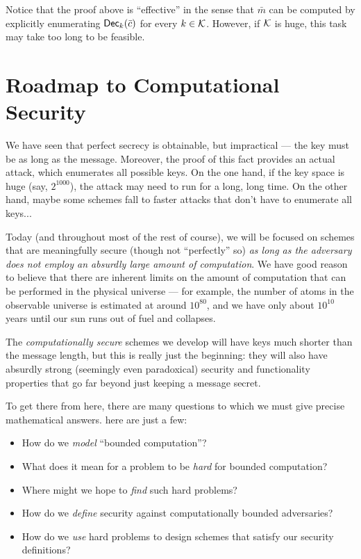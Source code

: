 \documentclass[11pt]{article}
\begin{document}
Notice that the proof above is ``effective'' in the sense that
$\bar{m}$ can be computed by explicitly enumerating
$\mathsf{Dec}_{k}(\bar{c})$ for every $k \in \mathcal{K}$.  However, if
$\mathcal{K}$ is huge, this task may take too long to be feasible.

\section{Roadmap to Computational Security}
\label{sec:roadmap-comp-sec}

We have seen that perfect secrecy is obtainable, but impractical ---
the key must be as long as the message.  Moreover, the proof of this
fact provides an actual attack, which enumerates all possible keys.
On the one hand, if the key space is huge (say, $2^{1000}$), the
attack may need to run for a long, long time.  On the other hand,
maybe some schemes fall to faster attacks that don't have to
enumerate all keys...

Today (and throughout most of the rest of course), we will be focused
on schemes that are meaningfully secure (though not ``perfectly'' so)
\emph{as long as the adversary does not employ an absurdly large
  amount of computation}.  We have good reason to believe that there
are inherent limits on the amount of computation that can be performed
in the physical universe --- for example, the number of atoms in the
observable universe is estimated at around $10^{80}$, and we have only
about $10^{10}$ years until our sun runs out of fuel and collapses.

The \emph{computationally secure} schemes we develop will have keys
much shorter than the message length, but this is really just the
beginning: they will also have absurdly strong (seemingly even
paradoxical) security and functionality properties that go far beyond
just keeping a message secret.

To get there from here, there are many questions to which we must give
precise mathematical answers.  here are just a few:
\begin{itemize}
\item How do we \emph{model} ``bounded computation''?
\item What does it mean for a problem to be \emph{hard} for bounded
  computation?
\item Where might we hope to \emph{find} such hard problems?
\item How do we \emph{define} security against computationally bounded
  adversaries?
\item How do we \emph{use} hard problems to design schemes that
  satisfy our security definitions?
\end{itemize}
\end{document}
